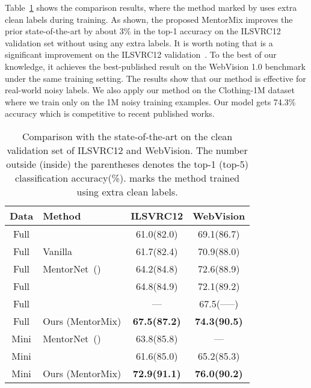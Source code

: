 \documentclass{article}
\begin{document}
Table~\ref{tab:webvision} shows the comparison results, where the method marked by  uses extra clean labels during training. As shown, the proposed MentorMix improves the prior state-of-the-art by about 3\% in the top-1 accuracy on the ILSVRC12 validation set without using any extra labels. It is worth noting that  is a significant improvement on the ILSVRC12 validation~\citep{deng2009imagenet}. To the best of our knowledge, it achieves the best-published result on the WebVision 1.0 benchmark under the same training setting. The results show that our method is effective for real-world noisy labels. We also apply our method on the Clothing-1M dataset where we train only on the 1M noisy training examples. Our model gets 74.3\% accuracy which is competitive to recent published works.

\begin{table}[ht!]
\vspace{-3mm}
\centering
\caption{Comparison with the state-of-the-art on the clean validation set of ILSVRC12 and WebVision. The number outside (inside) the parentheses denotes the top-1 (top-5) classification accuracy(\%).  marks the method trained using extra clean labels.}
\label{tab:webvision}
\small
\begin{tabular}{c|lcc}
\toprule
{Data} & {Method} & {ILSVRC12} & {WebVision} \\
\midrule
Full& \citet{lee2017cleannet}& 61.0(82.0) & 69.1(86.7) \\
Full&Vanilla & 61.7(82.4) & 70.9(88.0) \\
Full& MentorNet~(\citeyear{jiang2018mentornet})& 64.2(84.8) & 72.6(88.9) \\
Full& \citet{guo2018curriculumnet}& 64.8(84.9) & 72.1(89.2) \\
Full& \citet{saxena2019data} & ---& 67.5(-----) \\
Full&Ours (MentorMix) & {\bf 67.5(87.2)} & {\bf 74.3(90.5)} \\
\hline
Mini& MentorNet~(\citeyear{jiang2018mentornet}) & 63.8(85.8) & --- \\
Mini& \citet{chen2019understanding} & 61.6(85.0) & 65.2(85.3) \\
Mini& Ours (MentorMix) & {\bf 72.9(91.1)} & {\bf 76.0(90.2)} \\
\bottomrule
\end{tabular}
\vspace{-3mm}
\end{table}
\end{document}
